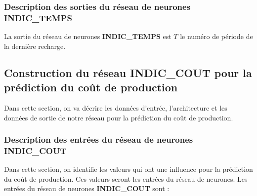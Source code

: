 \subsubsection{Description des sorties du réseau de neurones \textbf{INDIC\_TEMPS}}
La sortie du réseau de neurones \textbf{INDIC\_TEMPS} est $T$ le numéro de période de la dernière recharge.
\subsection{Construction du réseau \textbf{INDIC\_COUT} pour la prédiction du coût de production}
Dans cette section, on va décrire les données d'entrée, l'architecture et les données de sortie de notre réseau pour la prédiction du coût de production.
\subsubsection{Description des entrées du réseau de neurones \textbf{INDIC\_COUT}}
Dans cette section, on identifie les valeurs qui ont une influence pour la prédiction du coût de production. Ces valeurs seront les entrées du réseau de neurones.
Les entrées du réseau de neurones \textbf{INDIC\_COUT} sont :

